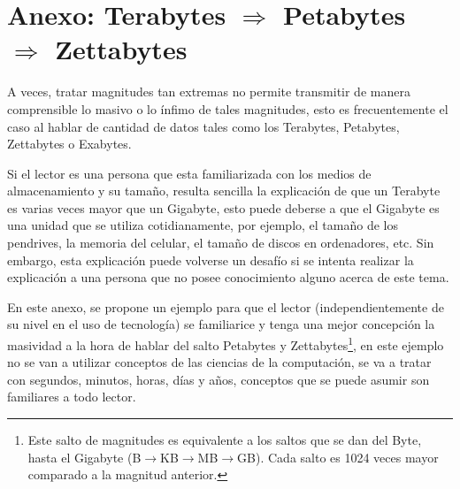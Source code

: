 \clearpage
\section*{Anexo: Terabytes $\Rightarrow$ Petabytes $\Rightarrow$ Zettabytes}
\label{sec:petabytes_a_zettabytes}

A veces, tratar magnitudes tan extremas no permite transmitir de manera
comprensible lo masivo o lo ínfimo de tales magnitudes,
esto es frecuentemente el caso al hablar de cantidad de
datos tales como los Terabytes, Petabytes, Zettabytes o Exabytes.

Si el lector es una persona que esta familiarizada con los medios de almacenamiento
y su tamaño, resulta sencilla la explicación de que un Terabyte es varias veces mayor que
un Gigabyte, esto puede deberse a que el Gigabyte es una unidad que se utiliza
cotidianamente, por ejemplo, el tamaño de los pendrives, la memoria del celular,
el tamaño de discos en ordenadores, etc. Sin embargo, esta explicación puede
volverse un desafío si se intenta realizar la explicación a una persona que no
posee conocimiento alguno acerca de este tema.

En este anexo, se propone un ejemplo para que el lector (independientemente de
su nivel en el uso de tecnología) se familiarice y tenga una mejor
concepción la masividad a la hora de hablar del salto Petabytes y
Zettabytes\footnote{Este salto de magnitudes es equivalente a los saltos que se
dan del Byte, hasta el Gigabyte
(B$\rightarrow$KB$\rightarrow$MB$\rightarrow$GB). Cada salto es 1024 veces
mayor comparado a la magnitud anterior.}, en este ejemplo no se van a utilizar
conceptos de las ciencias de la computación, se va a tratar 
con segundos, minutos, horas, días y años, conceptos que se puede asumir son
familiares a todo lector.


